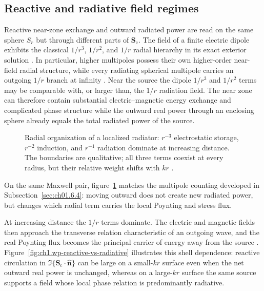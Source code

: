 \subsection{Reactive and radiative field regimes}
\label{sec:ch01.2.4}

Reactive near-zone exchange and outward radiated power are read on the same sphere $S_r$ but through different parts of $\mathbf{S}_\mathrm{c}$. The field of a finite electric dipole exhibits the classical $1/r^3$, $1/r^2$, and $1/r$ radial hierarchy in its exact exterior solution \cite{stratton1941}. In particular, higher multipoles possess their own higher-order near-field radial structure, while every radiating spherical multipole carries an outgoing $1/r$ branch at infinity \cite{stratton1941,hansen1988}. Near the source the dipole $1/r^3$ and $1/r^2$ terms may be comparable with, or larger than, the $1/r$ radiation field. The near zone can therefore contain substantial electric--magnetic energy exchange and complicated phase structure while the outward real power through an enclosing sphere already equals the total radiated power of the source.

\begin{figure}[t]
\centering
\VolIPhysFig{\VolIPhysRadialFieldZones}
\caption{Radial organization of a localized radiator: $r^{-3}$ electrostatic storage, $r^{-2}$ induction, and $r^{-1}$ radiation dominate at increasing distance. The boundaries are qualitative; all three terms coexist at every radius, but their relative weight shifts with $kr$ \cite{stratton1941,poynting1884}.}
\label{fig:ch1.radial-field-zones}
\end{figure}

On the same Maxwell pair, figure~\ref{fig:ch1.radial-field-zones} matches the multipole counting developed in Subsection~\ref{sec:ch01.6.4}: moving outward does not create new radiated power, but changes which radial term carries the local Poynting and stress flux.

At increasing distance the $1/r$ terms dominate. The electric and magnetic fields then approach the transverse relation characteristic of an outgoing wave, and the real Poynting flux becomes the principal carrier of energy away from the source \cite{poynting1884}. Figure~\ref{fig:ch1.wp-reactive-vs-radiative} illustrates this shell dependence: reactive circulation in $\Im\{\mathbf{S}_\mathrm{c}\cdot\hat{\mathbf{n}}\}$ can be large on a small-$kr$ surface even when the net outward real power is unchanged, whereas on a large-$kr$ surface the same source supports a field whose local phase relation is predominantly radiative.

